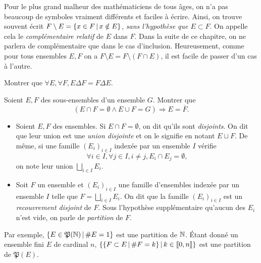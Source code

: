 Pour le plus grand malheur des mathématiciens de tous âges, on n'a pas beaucoup de symboles vraiment différents et faciles à écrire. Ainsi, on trouve souvent écrit $F \setminus E = \{x \in F \,\vert\, x \notin E\}$, \emph{sans l'hypothèse que $E \subset F$}. On appelle cela le \emph{complémentaire relatif} de $E$ dans $F$. Dans la suite de ce chapitre, on ne parlera de complémentaire que dans le cas d'inclusion. Heureusement, comme pour tous ensembles $E, F$ on a $F \setminus E = F \setminus (F \cap E)$, il est facile de passer d'un cas à l'autre.

\begin{rlined}
    \begin{exo}
        Montrer que $\forall E, \forall F, E\Delta F = F\Delta E$.
    \end{exo}
    \begin{exo}
        Soient $E, F$ des sous-ensembles d'un ensemble $G$. Montrer que $$(E \cap F = \emptyset \wedge E \cup F = G) \Rightarrow E = \overline{F}.$$
    \end{exo}
\end{rlined}

\begin{dftn}
    \begin{itemize}
        \item Soient $E, F$ des ensembles. Si $E \cap F = \emptyset$, on dit qu'ils sont \emph{disjoints}. On dit que leur union est une \emph{union disjointe} et on le signifie en notant $E \sqcup F$. De même, si une famille $(E_i)_{i\in I}$ indexée par un ensemble $I$ vérifie
        $$\forall i \in I, \forall j \in I, i \neq j, E_i \cap E_j = \emptyset,$$
        on note leur union $\bigsqcup_{i\in I}E_i$.
        \item Soit $F$ un ensemble et $(E_i)_{i\in I}$ une famille d'ensembles indexée par un ensemble $I$ telle que $F = \bigsqcup_{i\in I}E_i$. On dit que la famille $(E_i)_{i\in I}$ est un \emph{recouvrement disjoint} de $F$. Sous l'hypothèse supplémentaire qu'aucun des $E_i$ n'est vide, on parle de \emph{partition} de $F$.
    \end{itemize}
\end{dftn}

\begin{lined}
    Par exemple, $\{E \in \mathfrak{P}(\mathbb{N}) \,\vert\, \#E = 1\}$ est une partition de $\mathbb{N}$. \'Etant donné un ensemble fini $E$ de cardinal $n$, $\{\{F \subset E \,\vert\, \#F = k\} \,\vert\, k \in \llbracket {0, n} \rrbracket\}$ est une partition de $\mathfrak{P}(E)$.
\end{lined}

